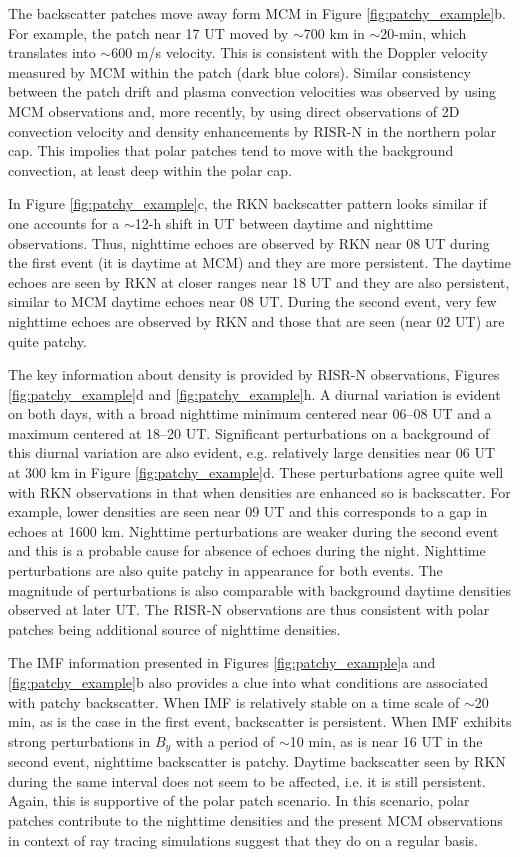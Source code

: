 The backscatter patches move away form MCM in Figure \ref{fig:patchy_example}b.  For example, the patch near 17 UT moved by \(\sim700\) km in \(\sim\)20-min, which translates into \(\sim600\) m/s velocity.  This is consistent with the Doppler velocity measured by MCM within the patch (dark blue colors).  Similar consistency between the patch drift and plasma convection velocities was observed by \citet{Bristow2011} using MCM observations and, more recently, by \citet{Makarevich2015b} using direct observations of 2D convection velocity and density enhancements by RISR-N in the northern polar cap.  This impolies that polar patches tend to move with the background convection, at least deep within the polar cap.

In Figure \ref{fig:patchy_example}c, the RKN backscatter pattern looks similar if one accounts for a \(\sim\)12-h  shift in UT between daytime and nighttime observations. Thus, nighttime echoes are observed by RKN near 08 UT during the first event (it is daytime at MCM) and they are more persistent. The daytime echoes are seen by RKN at closer ranges near 18 UT and they are also persistent, similar to MCM daytime echoes near 08 UT. During the second event, very few nighttime echoes are observed by RKN and those that are seen (near 02 UT) are quite patchy.

The key information about density is provided by RISR-N observations, Figures \ref{fig:patchy_example}d and \ref{fig:patchy_example}h. A diurnal variation is evident on both days, with a broad nighttime minimum centered near 06--08 UT and a maximum centered at 18--20 UT. Significant perturbations on a background of this diurnal variation are also evident, e.g. relatively large densities near 06 UT at 300 km in Figure \ref{fig:patchy_example}d. These perturbations agree quite well with RKN observations in that when densities are enhanced so is backscatter. For example, lower densities are seen near 09 UT and this corresponds to a gap in echoes at 1600 km. Nighttime perturbations are weaker during the second event and this is a probable cause for absence of echoes during the night. Nighttime perturbations are also quite patchy in appearance for both events. The magnitude of perturbations is also comparable with background daytime densities observed at later UT. The RISR-N observations are thus consistent with polar patches being additional source of nighttime densities.

The IMF information presented in Figures \ref{fig:patchy_example}a and \ref{fig:patchy_example}b also provides a clue into what conditions are associated with patchy backscatter. When IMF is relatively stable on a time scale of \(\sim\)20 min, as is the case in the first event, backscatter is persistent. When IMF exhibits strong perturbations in \(B_y\) with a period of \(\sim\)10 min, as is near 16 UT in the second event, nighttime backscatter is patchy. Daytime backscatter seen by RKN during the same interval does not seem to be affected, i.e. it is still persistent. Again, this is supportive of the polar patch scenario.  In this scenario, polar patches contribute to the nighttime densities and the present MCM observations in context of ray tracing simulations suggest that they do on a regular basis.



